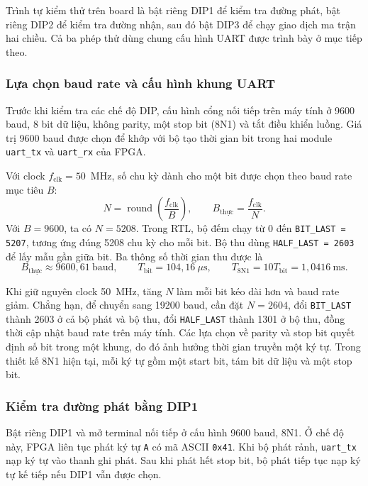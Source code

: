 Trình tự kiểm thử trên board là bật riêng DIP1 để kiểm tra đường
phát, bật riêng DIP2 để kiểm tra đường nhận, sau đó bật DIP3 để
chạy giao dịch ma trận hai chiều. Cả ba phép thử dùng chung cấu
hình UART được trình bày ở mục tiếp theo.

\subsubsection{Lựa chọn baud rate và cấu hình khung UART}

Trước khi kiểm tra các chế độ DIP, cấu hình cổng nối tiếp trên máy
tính ở 9600 baud, 8 bit dữ liệu, không parity, một stop bit (8N1)
và tắt điều khiển luồng. Giá trị 9600 baud được chọn để khớp với
bộ tạo thời gian bit trong hai module \texttt{uart\_tx} và
\texttt{uart\_rx} của FPGA.

Với clock $f_{\mathrm{clk}}=50$~MHz, số chu kỳ dành cho một bit
được chọn theo baud rate mục tiêu $B$:
\[
    N=\operatorname{round}\!\left(\frac{f_{\mathrm{clk}}}{B}\right),
    \qquad
    B_{\mathrm{thực}}=\frac{f_{\mathrm{clk}}}{N}.
\]
Với $B=9600$, ta có $N=5208$. Trong RTL, bộ đếm chạy từ 0 đến
\texttt{BIT\_LAST = 5207}, tương ứng đúng 5208 chu kỳ cho mỗi bit.
Bộ thu dùng \texttt{HALF\_LAST = 2603} để lấy mẫu gần giữa bit.
Ba thông số thời gian thu được là
\[
    B_{\mathrm{thực}}\approx 9600{,}61~\mathrm{baud},\qquad
    T_{\mathrm{bit}}=104{,}16~\mu\mathrm{s},\qquad
    T_{\mathrm{8N1}}=10T_{\mathrm{bit}}=1{,}0416~\mathrm{ms}.
\]

Khi giữ nguyên clock 50~MHz, tăng $N$ làm mỗi bit kéo dài hơn và
baud rate giảm. Chẳng hạn, để chuyển sang 19200 baud, cần đặt
$N=2604$, đổi \texttt{BIT\_LAST} thành 2603 ở cả bộ phát và bộ thu,
đổi \texttt{HALF\_LAST} thành 1301 ở bộ thu, đồng thời cập nhật
baud rate trên máy tính. Các lựa chọn về parity và stop bit quyết
định số bit trong một khung, do đó ảnh hưởng thời gian truyền một
ký tự. Trong thiết kế 8N1 hiện tại, mỗi ký tự gồm một start bit,
tám bit dữ liệu và một stop bit.

\subsubsection{Kiểm tra đường phát bằng DIP1}

Bật riêng DIP1 và mở terminal nối tiếp ở cấu hình 9600 baud, 8N1.
Ở chế độ này, FPGA liên tục phát ký tự \texttt{A} có mã ASCII
\texttt{0x41}. Khi bộ phát rảnh, \texttt{uart\_tx} nạp ký tự vào
thanh ghi phát. Sau khi phát hết stop bit, bộ phát tiếp tục nạp
ký tự kế tiếp nếu DIP1 vẫn được chọn.

